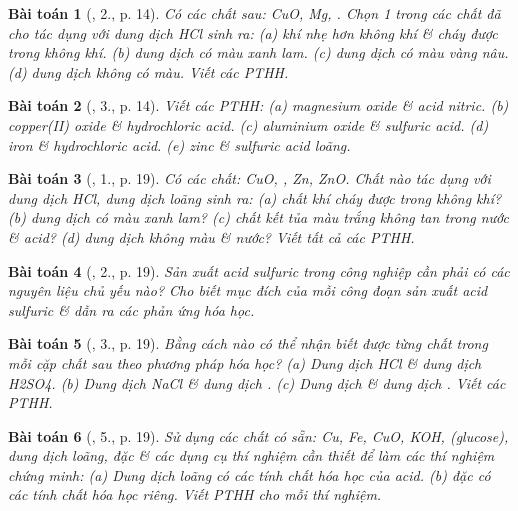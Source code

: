 \documentclass{article}
\newtheorem{baitoan}{Bài toán}
\begin{document}
\begin{baitoan}[\cite{SGK_Hoa_Hoc_9}, 2., p. 14]
	Có các chất sau: \emph{CuO, Mg, }. Chọn 1 trong các chất đã cho tác dụng với dung dịch \emph{HCl} sinh ra: (a) khí nhẹ hơn không khí \& cháy được trong không khí. (b) dung dịch có màu xanh lam. (c) dung dịch có màu vàng nâu. (d) dung dịch không có màu. Viết các PTHH.
\end{baitoan}

\begin{baitoan}[\cite{SGK_Hoa_Hoc_9}, 3., p. 14]
	Viết các PTHH: (a) magnesium oxide \& acid nitric. (b) copper(II) oxide \& hydrochloric acid. (c) aluminium oxide \& sulfuric acid. (d) iron \& hydrochloric acid. (e) zinc \& sulfuric acid loãng.
\end{baitoan}

\begin{baitoan}[\cite{SGK_Hoa_Hoc_9}, 1., p. 19]
	Có các chất: \emph{CuO, , Zn, ZnO}. Chất nào tác dụng với dung dịch \emph{HCl}, dung dịch \emph{} loãng sinh ra: (a) chất khí cháy được trong không khí? (b) dung dịch có màu xanh lam? (c) chất kết tủa màu trắng không tan trong nước \& acid? (d) dung dịch không màu \& nước? Viết tất cả các PTHH.
\end{baitoan}

\begin{baitoan}[\cite{SGK_Hoa_Hoc_9}, 2., p. 19]
	Sản xuất acid sulfuric trong công nghiệp cần phải có các nguyên liệu chủ yếu nào? Cho biết mục đích của mỗi công đoạn sản xuất acid sulfuric \& dẫn ra các phản ứng hóa học.
\end{baitoan}

\begin{baitoan}[\cite{SGK_Hoa_Hoc_9}, 3., p. 19]
	Bằng cách nào có thể nhận biết được từng chất trong mỗi cặp chất sau theo phương pháp hóa học? (a) Dung dịch \emph{HCl} \& dung dịch \emph{H2SO4}. (b) Dung dịch \emph{NaCl} \& dung dịch \emph{}. (c) Dung dịch \emph{} \& dung dịch \emph{}. Viết các PTHH.
\end{baitoan}

\begin{baitoan}[\cite{SGK_Hoa_Hoc_9}, 5., p. 19]
	Sử dụng các chất có sẵn: \emph{Cu, Fe, CuO, KOH, } (glucose), dung dịch \emph{} loãng, \emph{} đặc \& các dụng cụ thí nghiệm cần thiết để làm các thí nghiệm chứng minh: (a) Dung dịch \emph{} loãng có các tính chất hóa học của acid. (b) \emph{} đặc có các tính chất hóa học riêng. Viết PTHH cho mỗi thí nghiệm.
\end{baitoan}
\end{document}
